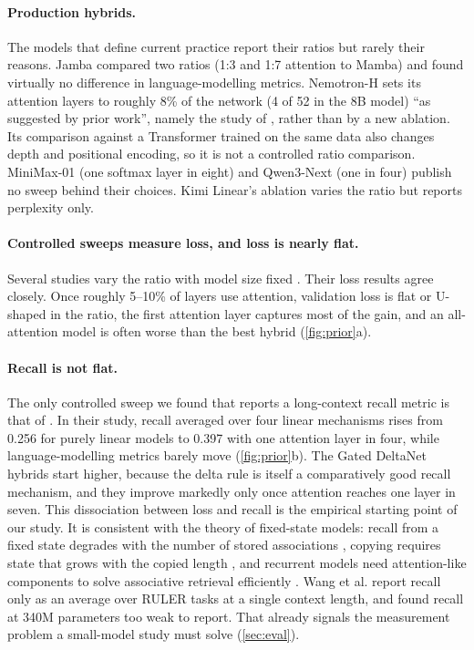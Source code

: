 \documentclass[10pt,a4paper]{article}
\begin{document}
\paragraph{Production hybrids.}
The models that define current practice report their ratios but rarely their reasons. Jamba
\citep{lieber2024jamba} compared two ratios (1:3 and 1:7 attention to Mamba) and found virtually no
difference in language-modelling metrics. Nemotron-H \citep{nvidia2025nemotronh} sets its attention layers to roughly 8\% of the network
(4 of 52 in the 8B model) ``as suggested by prior work'', namely the study of
\citet{waleffe2024empirical}, rather than by a new ablation. Its comparison against a Transformer trained on the same data also changes depth and
positional encoding, so it is not a controlled ratio comparison. MiniMax-01 \citep{minimax2025minimax01}
(one softmax layer in eight) and Qwen3-Next \citep{qwen2025qwen3next} (one in four) publish no sweep
behind their choices. Kimi Linear's ablation \citep{kimi2025linear} varies the ratio but reports
perplexity only.

\paragraph{Controlled sweeps measure loss, and loss is nearly flat.}
Several studies vary the ratio with model size fixed
\citep{waleffe2024empirical,dao2024transformers,bae2025hybrid,wang2025systematic,kimi2025linear}.
Their loss results agree closely. Once roughly 5--10\% of layers use attention, validation loss
is flat or U-shaped in the ratio, the first attention layer captures most of the gain, and an
all-attention model is often worse than the best hybrid (\cref{fig:prior}a).

\paragraph{Recall is not flat.}
The only controlled sweep we found that reports a long-context recall metric is that of
\citet{wang2025systematic}. In their study, recall averaged over four linear mechanisms rises from
0.256 for purely linear models to 0.397 with one attention layer in four, while language-modelling
metrics barely move (\cref{fig:prior}b). The Gated DeltaNet hybrids start higher, because the delta
rule is itself a comparatively good recall mechanism, and they improve markedly only once attention
reaches one layer in seven. This dissociation between loss and recall is the empirical starting
point of our study. It is consistent with the theory of fixed-state models: recall from a fixed
state degrades with the number of stored associations \citep{arora2023zoology,arora2024simple},
copying requires state that grows with the copied length \citep{jelassi2024repeat}, and recurrent
models need attention-like components to solve associative retrieval efficiently
\citep{wen2024rnns}. Wang et al. report recall only as an average over RULER tasks
\citep{hsieh2024ruler} at a single context length, and found recall at 340M parameters too weak to
report. That already signals the measurement problem a small-model study must solve
(\cref{sec:eval}).
\end{document}
